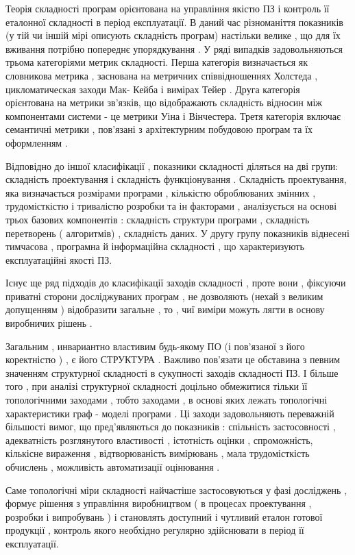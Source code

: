 Теорія складності програм орієнтована на управління якістю ПЗ і контроль її еталонної складності в період експлуатації. В даний час різноманіття показників (у тій чи іншій мірі описують складність програм) настільки велике , що для їх вживання потрібно попереднє упорядкування . У ряді випадків задовольняються трьома категоріями метрик складності. Перша категорія визначається як словникова метрика , заснована на метричних співвідношеннях Холстеда , цикломатическая заходи Мак- Кейба і вимірах Тейер . Друга категорія орієнтована на метрики зв'язків, що відображають складність відносин між компонентами системи - це метрики Уіна і Вінчестера. Третя категорія включає семантичні метрики , пов'язані з архітектурним побудовою програм та їх оформленням .

Відповідно до іншої класифікації , показники складності діляться на дві групи: складність проектування і складність функціонування . Складність проектування, яка визначається розмірами програми , кількістю оброблюваних змінних , трудомісткістю і тривалістю розробки та ін факторами , аналізується на основі трьох базових компонентів : складність структури програми , складність перетворень ( алгоритмів) , складність даних. У другу групу показників віднесені тимчасова , програмна й інформаційна складності , що характеризують експлуатаційні якості ПЗ.

Існує ще ряд підходів до класифікації заходів складності , проте вони , фіксуючи приватні сторони досліджуваних програм , не дозволяють (нехай з великим допущенням ) відобразити загальне , то , чиї виміри можуть лягти в основу виробничих рішень .

Загальним , инвариантно властивим будь-якому ПО (і пов'язаної з його коректністю ) , є його СТРУКТУРА . Важливо пов'язати це обставина з певним значенням структурної складності в сукупності заходів складності ПЗ. І більше того , при аналізі структурної складності доцільно обмежитися тільки її топологічними заходами , тобто заходами , в основі яких лежать топологічні характеристики граф - моделі програми . Ці заходи задовольняють переважній більшості вимог, що пред'являються до показників : спільність застосовності , адекватність розглянутого властивості , істотність оцінки , спроможність, кількісне вираження , відтворюваність вимірювань , мала трудомісткість обчислень , можливість автоматизації оцінювання .

Саме топологічні міри складності найчастіше застосовуються у фазі досліджень , формує рішення з управління виробництвом ( в процесах проектування , розробки і випробувань ) і становлять доступний і чутливий еталон готової продукції , контроль якого необхідно регулярно здійснювати в період її експлуатації.

